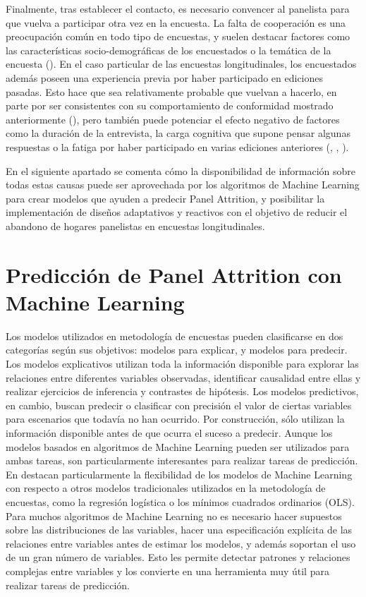 Finalmente, tras establecer el contacto, es necesario convencer al panelista para que vuelva a participar otra vez en la encuesta. La falta de cooperación es una preocupación común en todo tipo de encuestas, y suelen destacar factores como las características socio-demográficas de los encuestados o la temática de la encuesta (\cite{groves1992understanding}). En el caso particular de las encuestas longitudinales, los encuestados además poseen una experiencia previa por haber participado en ediciones pasadas. Esto hace que sea relativamente probable que vuelvan a hacerlo, en parte por ser consistentes con su comportamiento de conformidad mostrado anteriormente (\cite{groves1992understanding}), pero también puede potenciar el efecto negativo de factores como la duración de la entrevista, la carga cognitiva que supone pensar algunas respuestas o la fatiga por haber participado en varias ediciones anteriores (\cite{laurie1999strategies}, \cite{watson2009identifying}, \cite{lynn2018tackling}).

En el siguiente apartado se comenta cómo la disponibilidad de información sobre todas estas causas puede ser aprovechada por los algoritmos de Machine Learning para crear modelos que ayuden a predecir Panel Attrition, y posibilitar la implementación de diseños adaptativos y reactivos con el objetivo de reducir el abandono de hogares panelistas en encuestas longitudinales.

\section{Predicción de Panel Attrition con Machine Learning}

Los modelos utilizados en metodología de encuestas pueden clasificarse en dos categorías según sus objetivos: modelos para explicar, y modelos para predecir. Los modelos explicativos utilizan toda la información disponible para explorar las relaciones entre diferentes variables observadas, identificar causalidad entre ellas y realizar ejercicios de inferencia y contrastes de hipótesis. Los modelos predictivos, en cambio, buscan predecir o clasificar con precisión el valor de ciertas variables para escenarios que todavía no han ocurrido. Por construcción, sólo utilizan la información disponible antes de que ocurra el suceso a predecir. Aunque los modelos basados en algoritmos de Machine Learning pueden ser utilizados para ambas tareas, son particularmente interesantes para realizar tareas de predicción. En \cite{buskirk2018introduction} destacan particularmente la flexibilidad de los modelos de Machine Learning con respecto a otros modelos tradicionales utilizados en la metodología de encuestas, como la regresión logística o los mínimos cuadrados ordinarios (OLS). Para muchos algoritmos de Machine Learning no es necesario hacer supuestos sobre las distribuciones de las variables, hacer una especificación explícita de las relaciones entre variables antes de estimar los modelos, y además soportan el uso de un gran número de variables. Esto les permite detectar patrones y relaciones complejas entre variables y los convierte en una herramienta muy útil para realizar tareas de predicción.

